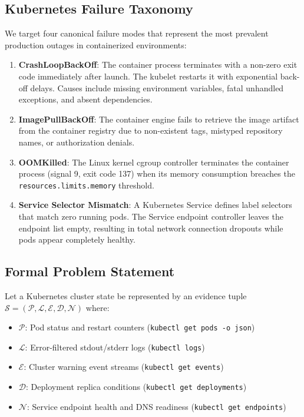 \documentclass[12pt,onecolumn,draftclsnofoot]{IEEEtran}
\begin{document}
\subsection{Kubernetes Failure Taxonomy}
We target four canonical failure modes that represent the most prevalent production outages in containerized environments:
\begin{enumerate}
  \item \textbf{CrashLoopBackOff}: The container process terminates with a non-zero exit code immediately after launch. The kubelet restarts it with exponential back-off delays. Causes include missing environment variables, fatal unhandled exceptions, and absent dependencies.
  \item \textbf{ImagePullBackOff}: The container engine fails to retrieve the image artifact from the container registry due to non-existent tags, mistyped repository names, or authorization denials.
  \item \textbf{OOMKilled}: The Linux kernel cgroup controller terminates the container process (signal 9, exit code 137) when its memory consumption breaches the \texttt{resources.limits.memory} threshold.
  \item \textbf{Service Selector Mismatch}: A Kubernetes Service defines label selectors that match zero running pods. The Service endpoint controller leaves the endpoint list empty, resulting in total network connection dropouts while pods appear completely healthy.
\end{enumerate}

\subsection{Formal Problem Statement}
Let a Kubernetes cluster state be represented by an evidence tuple $\mathcal{S} = (\mathcal{P}, \mathcal{L}, \mathcal{E}, \mathcal{D}, \mathcal{N})$ where:
\begin{itemize}
  \item $\mathcal{P}$: Pod status and restart counters (\texttt{kubectl get pods -o json})
  \item $\mathcal{L}$: Error-filtered stdout/stderr logs (\texttt{kubectl logs})
  \item $\mathcal{E}$: Cluster warning event streams (\texttt{kubectl get events})
  \item $\mathcal{D}$: Deployment replica conditions (\texttt{kubectl get deployments})
  \item $\mathcal{N}$: Service endpoint health and DNS readiness (\texttt{kubectl get endpoints})
\end{itemize}
\end{document}
